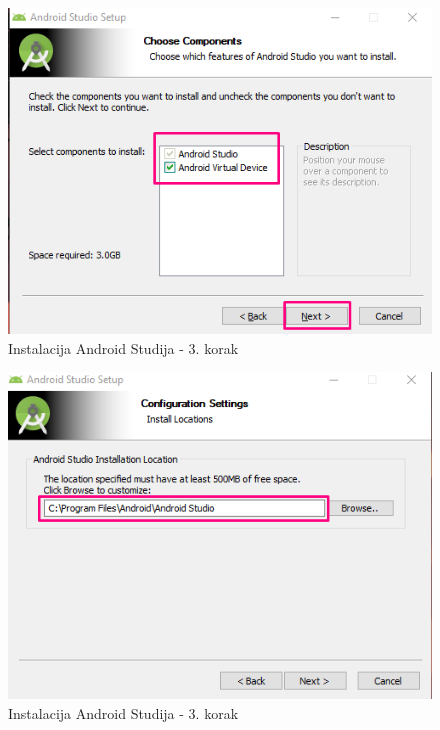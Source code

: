 \documentclass[11pt,a4paper,twoside]{article}
\begin{document}
\begin{figure}[!h]
	\centering
	\includegraphics{install_03.png}
	\caption{Instalacija Android Studija - 3. korak}
	\label{fig:install_03}	
\end{figure}

\begin{figure}[!h]
	\centering
	\includegraphics{install_04.png}
	\caption{Instalacija Android Studija - 3. korak}
	\label{fig:install_03}	
\end{figure}
\end{document}
